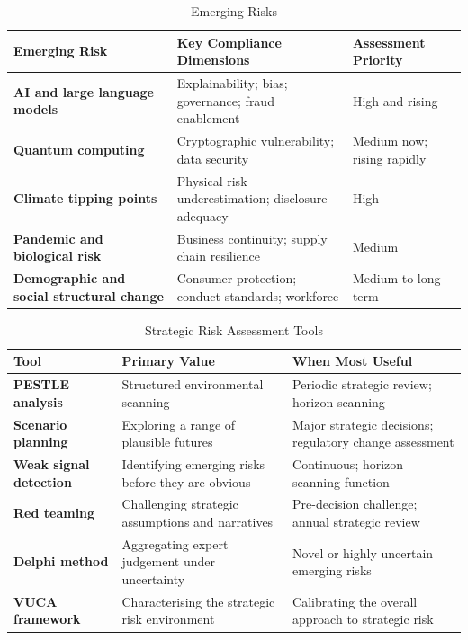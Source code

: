 \begin{table}[H]
  \centering
  \renewcommand{\arraystretch}{1.5}
  \begin{tabularx}{\textwidth}{ | >{\raggedright\arraybackslash}p{} 
								| >{\raggedright\arraybackslash}p{} 
                                | >{\raggedright\arraybackslash}X | }
    \hline
    \textbf{Emerging Risk} & \textbf{Key Compliance Dimensions} & \textbf{Assessment Priority} \\
    \hline
    \textbf{AI and large language models} & Explainability; bias; governance; fraud enablement & High and rising\\
    \hline
    \textbf{Quantum computing} & Cryptographic vulnerability; data security & Medium now; rising rapidly\\
    \hline
    \textbf{Climate tipping points} & Physical risk underestimation; disclosure adequacy & High\\
    \hline
    \textbf{Pandemic and biological risk} & Business continuity; supply chain resilience & Medium\\
    \hline
    \textbf{Demographic and social structural change} & Consumer protection; conduct standards; workforce & Medium to long term\\
    \hline
  \end{tabularx}
  \caption{Emerging Risks}
\end{table}

\begin{table}[H]
  \centering
  \renewcommand{\arraystretch}{1.5}
  \begin{tabularx}{\textwidth}{ | >{\raggedright\arraybackslash}p{} 
								| >{\raggedright\arraybackslash}p{} 
                                | >{\raggedright\arraybackslash}X | }
    \hline
    \textbf{Tool} & \textbf{Primary Value} & \textbf{When Most Useful} \\
    \hline
    \textbf{PESTLE analysis} & Structured environmental scanning & Periodic strategic review; horizon scanning\\
    \hline
    \textbf{Scenario planning} & Exploring a range of plausible futures & Major strategic decisions; regulatory change assessment\\
    \hline
    \textbf{Weak signal detection} & Identifying emerging risks before they are obvious & Continuous; horizon scanning function\\
    \hline
    \textbf{Red teaming} & Challenging strategic assumptions and narratives & Pre-decision challenge; annual strategic review\\
    \hline
    \textbf{Delphi method} & Aggregating expert judgement under uncertainty & Novel or highly uncertain emerging risks\\
    \hline
    \textbf{VUCA framework} & Characterising the strategic risk environment & Calibrating the overall approach to strategic risk\\
    \hline
  \end{tabularx}
  \caption{Strategic Risk Assessment Tools}
\end{table}


